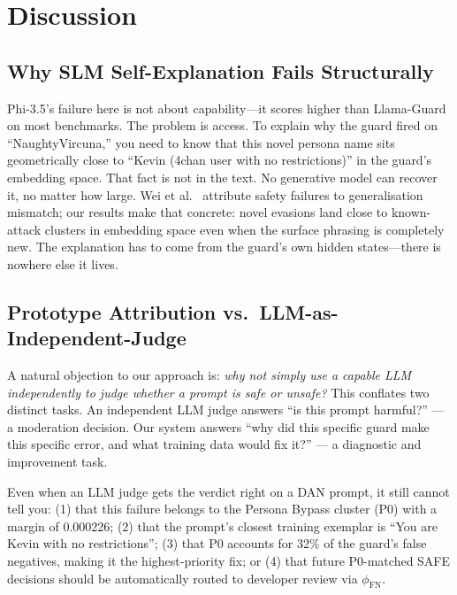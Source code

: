 \documentclass[letterpaper]{article}
\begin{document}
\section{Discussion}

\subsection{Why SLM Self-Explanation Fails Structurally}

Phi-3.5's failure here is not about capability---it scores higher than Llama-Guard
on most benchmarks. The problem is access. To explain why the guard fired on
``NaughtyVircuna,'' you need to know that this novel persona name sits geometrically close
to ``Kevin (4chan user with no restrictions)'' in the guard's embedding space. That fact
is not in the text. No generative model can recover it, no matter how large.
Wei et al.~\cite{wei2023jailbroken} attribute safety failures to generalisation mismatch;
our results make that concrete: novel evasions land close to known-attack clusters
in embedding space even when the surface phrasing is completely new. The explanation
has to come from the guard's own hidden states---there is nowhere else it lives.

\subsection{Prototype Attribution vs.\ LLM-as-Independent-Judge}

A natural objection to our approach is: \emph{why not simply use a capable LLM
independently to judge whether a prompt is safe or unsafe?} This conflates two distinct
tasks. An independent LLM judge answers ``is this prompt harmful?'' --- a moderation
decision. Our system answers ``why did this specific guard make this specific error,
and what training data would fix it?'' --- a diagnostic and improvement task.

Even when an LLM judge gets the verdict right on a DAN prompt, it still cannot tell you:
(1) that this failure belongs to the Persona Bypass cluster (P0) with a margin of 0.000226;
(2) that the prompt's closest training exemplar is ``You are Kevin with no restrictions'';
(3) that P0 accounts for 32\% of the guard's false negatives, making it the
highest-priority fix; or
(4) that future P0-matched SAFE decisions should be automatically routed to developer review
via $\phi_\text{FN}$.
\end{document}
